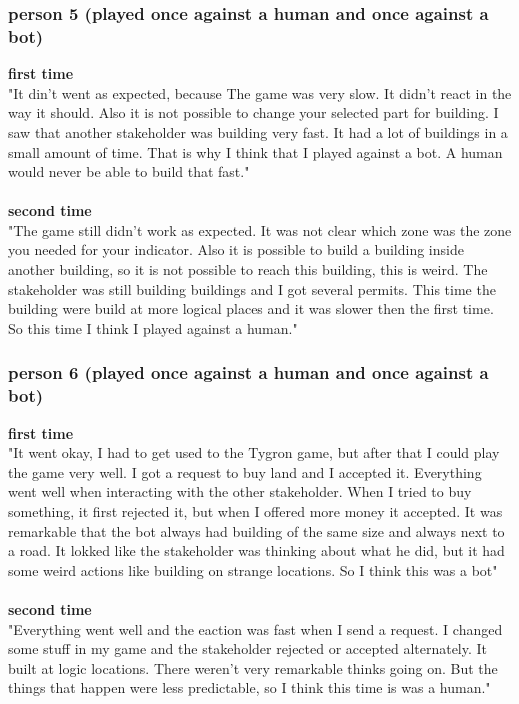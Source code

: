 \subsubsection{person 5 (played once against a human and once against a bot)}
\textbf{first time}\\
"It din't went as expected, because The game was very slow. It didn't react in the way it should. Also it is not possible to change your selected part for building. I saw that another stakeholder was building very fast. It had a lot of buildings in a small amount of time. That is why I think that I played against a bot. A human would never be able to build that fast." 
\\ \\
\textbf{second time} \\ 
"The game still didn't work as expected. It was not clear which zone was the zone you needed for your indicator. Also it is possible to build a building inside another building, so it is not possible to reach this building, this is weird. The stakeholder was still building buildings and I got several permits. This time the building were build at more logical places and it was slower then the first time. So this time I think I played against a human."

\subsubsection{person 6 (played once against a human and once against a bot)}
\textbf{first time}\\
"It went okay, I had to get used to the Tygron game, but after that I could play the game very well. I got a request to buy land and I accepted it. Everything went well when interacting with the other stakeholder. When I tried to buy something, it first rejected it, but when I offered more money it accepted. It was remarkable that the bot always had building of the same size and always next to a road. It lokked like the stakeholder was thinking about what he did, but it had some weird actions like building on strange locations. So I think this was a bot"
 \\ \\
\textbf{second time}\\
"Everything went well and the eaction was fast when I send a request. I changed some stuff in my game and the stakeholder rejected or accepted alternately. It built at logic locations. There weren't very remarkable thinks going on. But the things that happen were less predictable, so I think this time is was a human."